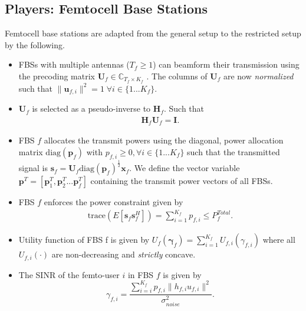\subsection{Players: Femtocell Base Stations}\label{conmodel_fbs}
Femtocell base stations are adapted from the general setup to the restricted setup by the following.
\begin{itemize}
\item 
	FBSs with multiple antennas ($T_f \geq 1$) can beamform their transmission using the precoding 	
	matrix $\mathbf{U}_{f} \in \mathbb{C}_{T_{f} \times K_{f}}$ .
	The columns of $\mathbf{U}_{f}$ are now \emph{normalized} such that 
	 $\|\mathbf{u}_{f,i}\|^2 =1 \;\forall i \in \{1 ... K_{f}\}$.
\\

\item 
$\mathbf{U}_f$ is selected as a pseudo-inverse to $\mathbf{H}_f$.
Such that
\begin{gather*}
\mathbf{H}_{f}  \mathbf{U}_{f} = \mathbf{I}.
\end{gather*} 


\item  
	FBS $f$ allocates the transmit powers using the diagonal, power allocation  	
	matrix $\mathrm{diag}(\mathbf{p}_{f})$ with $p_{f,i} \geq 0, \forall i \in \{1 ... K_{f}\}$
such that the transmitted 		
	signal is 
	$\mathbf{s}_{f	}= \mathbf{U}_{f} 
	\mathrm{diag}(\mathbf{p}_{f})^{\frac{1}{2}}
	\mathbf{x}_{f}$. We define the vector variable $\mathbf{p}^T= [\mathbf{p}_1^T, \mathbf{p}_2^T...\mathbf{p}_{f}^T]$ containing the transmit power vectors of all FBSs.
\\
\item 
	FBS $f$ enforces the power constraint given by
	\begin{gather*}
	\text{trace}(E[\mathbf{s}_f\mathbf{s}_f^H]) =
	\sum_{i=1}^{K_{f}} p_{f,i}
	  \leq P^{Total}_{f}.
	  	\end{gather*}




\item 
	Utility function of FBS f is given by $U_{f}(\boldsymbol{\gamma}_f) =
	\sum_{i=1}^{K_{f}}
    	U_{f,i}(\gamma_{f,i}) $
    	where all $U_{f,i}(\cdot)$ are non-decreasing and
    	\emph{strictly} concave.
\item The SINR of the femto-user $i$ in FBS $f$ is given by
\begin{equation}\label{zf_snr}
	\gamma_{f,i} =\frac{\sum_{i=i}^{K_{f}}
 p_{f,i}\|h_{f,i}u_{f,i}\|^2}
	{\sigma^2_{noise}  
	}.
	\end{equation}

\end{itemize}

